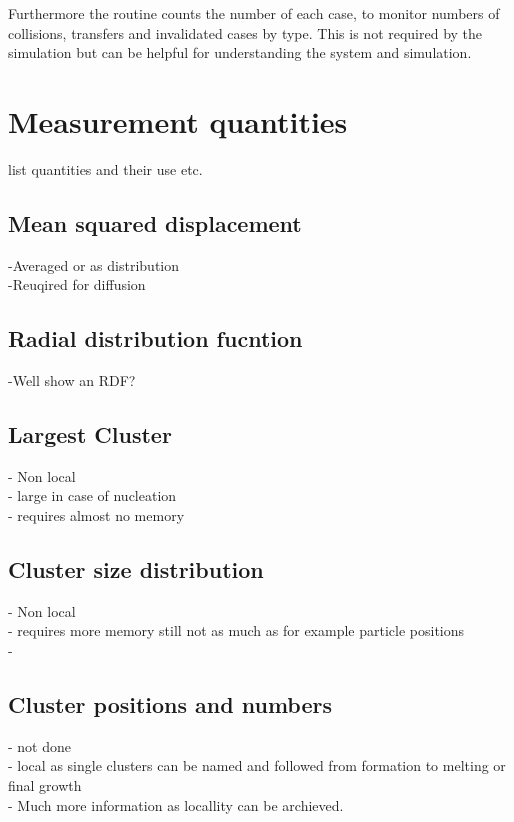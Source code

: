 Furthermore the routine counts the number of each case, to monitor numbers of collisions, transfers and invalidated cases by type. This is not required by the simulation but can be helpful for understanding the system and simulation.\\




\section{Measurement quantities}
\label{sec:cluster_quantities}
list quantities and their use etc.

\subsection{Mean squared displacement}
\label{sec:MSD}
-Averaged or as distribution\\
-Reuqired for diffusion\\

\subsection{Radial distribution fucntion}
\label{sec:RDF}
-Well show an RDF?

\subsection{Largest Cluster}
\label{sec:lc}
- Non local\\
- large in case of nucleation\\
- requires almost no memory\\

\subsection{Cluster size distribution}
\label{sec:pnt}
- Non local\\
- requires more memory still not as much as for example particle positions\\
- 

\subsection{Cluster positions and numbers}
\label{sec:cluster_position}
- not done\\
- local as single clusters can be named and followed from formation to melting or final growth\\
- Much more information as locallity can be archieved.\\


